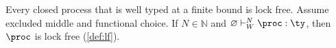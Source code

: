 \begin{theorem}
\label{thm:lf}
Every closed process that is well typed at a finite bound is lock free. Assume excluded middle and functional choice. If $N \in \mathbb{N}$ and $\varnothing \vdash^{N}_{W} \proc : \ty$, then $\proc$ is lock free (\cref{def:lf}).
\end{theorem}


\FloatBarrier
